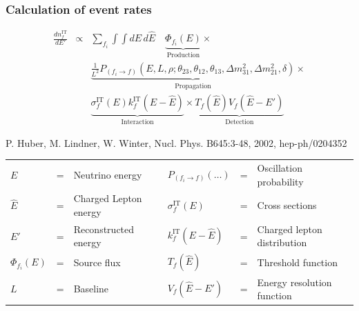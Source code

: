 \documentclass{beamer}
\newcommand{\reference}[1]{\tiny #1 \normalsize}
\begin{document}
\begin{frame}
  \frametitle{Calculation of event rates}
  \begin{block}{}
    \vspace{-0.2 cm}
    \begin{eqnarray*}
      \frac{dn_{f}^{\mathrm{IT}}}{dE'} &\propto&  \sum_{f_i}\int \int dE\,d\hat{E}\quad
                              \underbrace{\Phi_{f_i} (E)}_{\mathrm{Production}} \times \\
            &&\underbrace{\frac{1}{L^2} P_{(f_i\rightarrow f)}(E,L,\rho;\theta_{23},\theta_{12},\theta_{13},
                     \Delta m^2_{31},\Delta m^2_{21},\delta)}_{\mathrm{Propagation}}
                     \times \nonumber \\ &&\underbrace{\sigma^{\mathrm{IT}}_f(E)
                         k_f^{\mathrm{IT}}(E-\hat{E})}_{\mathrm{Interaction}} \times 
              \underbrace{ T_f(\hat{E}) V_f(\hat{E}-E')}_{\mathrm{Detection}}
    \end{eqnarray*}
    \begin{flushright}
      \reference{P. Huber, M. Lindner, W. Winter, Nucl. Phys. B645:3-48, 2002, hep-ph/0204352}
    \end{flushright}
  \end{block}
  \small
  \begin{tabular}{l@{\ }c@{\ }ll@{\ }c@{\ }l}
    $E$              &=& Neutrino energy       & $P_{(f_i\rightarrow f)}(\ldots)$ &=& Oscillation probability      \\
    $\hat{E}$        &=& Charged Lepton energy & $\sigma^{\mathrm{IT}}_f(E)$      &=& Cross sections               \\
    $E'$             &=& Reconstructed energy  & $k_f^{\mathrm{IT}}(E-\hat{E})$   &=& Charged lepton distribution  \\
    $\Phi_{f_i} (E)$ &=& Source flux           & $T_f(\hat{E})$                   &=& Threshold function           \\
    $L$              &=& Baseline              & $V_f(\hat{E}-E')$                &=& Energy resolution function
  \end{tabular}
\end{frame}
\end{document}
